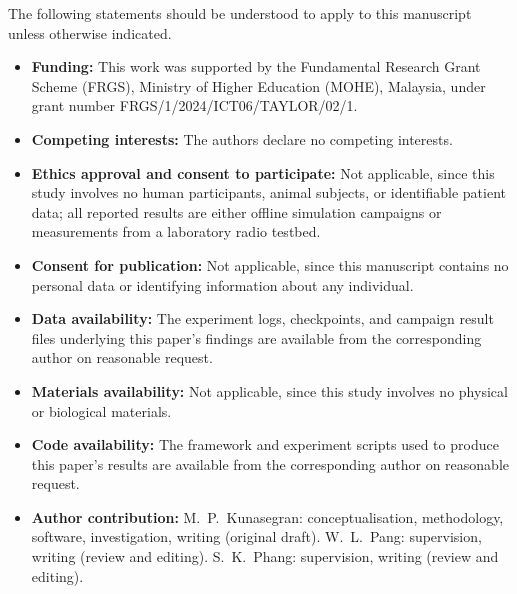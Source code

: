 \documentclass[pdflatex,sn-basic,Numbered]{sn-jnl}%
\begin{document}
\noindent The following statements should be understood to apply to
this manuscript unless otherwise indicated.

\begin{itemize}
\item \textbf{Funding:} This work was supported by the Fundamental Research Grant Scheme (FRGS), Ministry of Higher Education (MOHE), Malaysia, under grant number FRGS/1/2024/ICT06/TAYLOR/02/1.
\item \textbf{Competing interests:} The authors declare no competing interests.
\item \textbf{Ethics approval and consent to participate:} Not applicable, since this study involves no human participants, animal subjects, or identifiable patient data; all reported results are either offline simulation campaigns or measurements from a laboratory radio testbed.
\item \textbf{Consent for publication:} Not applicable, since this manuscript contains no personal data or identifying information about any individual.
\item \textbf{Data availability:} The experiment logs, checkpoints, and campaign result files underlying this paper's findings are available from the corresponding author on reasonable request.
\item \textbf{Materials availability:} Not applicable, since this study involves no physical or biological materials.
\item \textbf{Code availability:} The framework and experiment scripts used to produce this paper's results are available from the corresponding author on reasonable request.
\item \textbf{Author contribution:} M.\ P.\ Kunasegran: conceptualisation, methodology, software, investigation, writing (original draft). W.\ L.\ Pang: supervision, writing (review and editing). S.\ K.\ Phang: supervision, writing (review and editing).
\end{itemize}


\end{document}
